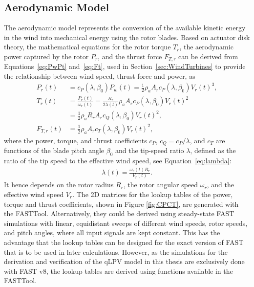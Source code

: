 \subsection{Aerodynamic Model}
The aerodynamic model represents the conversion of the available kinetic energy in the wind into mechanical energy using the rotor blades. Based on actuator disk theory, the mathematical equations for the rotor torque $T_{r}$, the aerodynamic power captured by the rotor $P_{r}$, and the thrust force $F_{T,r}$ can be derived from Equations~\eqref{eq:PwPt} and~\eqref{eq:Ft}, used in Section~\ref{sec:WindTurbines} to provide the relationship between wind speed, thrust force and power, as
\begin{equation}\label{eq:aero}
    \begin{split}
        P_{r}(t) & = c_P(\lambda,\beta_0) P_{w}(t) = \frac{1}{2} \rho_a A_r c_P(\lambda,\beta_0) V_r(t)^3, \\
        T_{r}(t) & = \frac{P_{r}(t)}{\omega_{r}(t)} %
        = \frac{R_r}{2\lambda(t)} \rho_a A_r  c_P(\lambda,\beta_0) V_r(t)^{2} \\
        & =  \frac{1}{2} \rho_a R_r A_r  c_Q(\lambda,\beta_0) V_r(t)^{2} ,\\
        F_{T,r}(t) & = \frac{1}{2} \rho_a A_r  c_{T}(\lambda,\beta_0) V_r(t)^{2},
    \end{split}
\end{equation}
where the power, torque, and thrust coefficients $c_P$, $c_Q = c_P/\lambda$, and $c_{T}$ are functions of the blade pitch angle $\beta_0$ and the tip-speed ratio $\lambda$, defined as the ratio of the tip speed to the effective wind speed, see Equation~\eqref{eq:lambda}:
\begin{align*}
    \lambda(t) = \frac{\omega_{r}(t) R_r}{V_r(t)}.
\end{align*}
It hence depends on the rotor radius $R_r$, the rotor angular speed $\omega_{r}$, and the effective wind speed $V_r$. The 2D matrices for the lookup tables of the power, torque and thrust coefficients, shown in Figure \ref{fig:CPCT}, are generated with the FASTTool.  Alternatively, they could be derived using steady-state FAST simulations with linear, equidistant sweeps of different wind speeds, rotor speeds, and pitch angles, where all input signals are kept constant. This has the advantage that the lookup tables can be designed for the exact version of FAST that is to be used in later calculations. However, as the simulations for the derivation and verification of the qLPV model in this thesis are exclusively done with FAST v8, the lookup tables are derived using functions available in the FASTTool.
